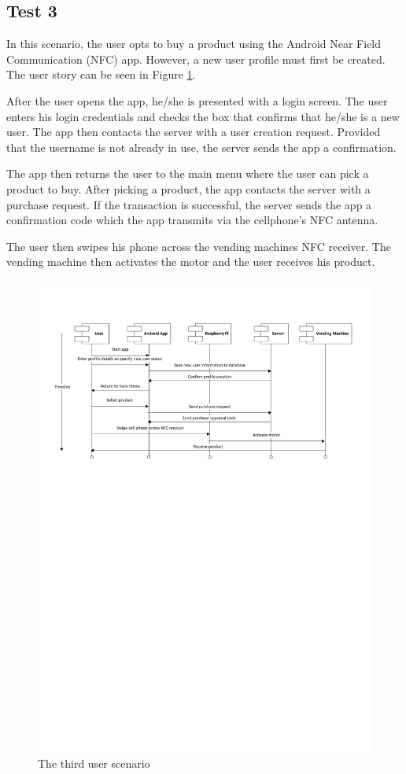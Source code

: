\subsection{Test 3}

In this scenario, the user opts to buy a product using the Android Near Field
Communication (NFC) app. However, a new user profile must first be created. The user story
can be seen in Figure \ref{fig:test3}.

After the user opens the app, he/she is presented with a login screen. The user enters
his login credentials and checks the box that confirms that he/she is a new user. The
app then contacts the server with a user creation request. Provided that the username is
not already in use, the server sends the app a confirmation.

The app then returns the user to the main menu where the user can pick a product to buy.
After picking a product, the app contacts the server with a purchase request. If the
transaction is successful, the server sends the app a confirmation code which the app 
transmits via the cellphone's NFC antenna. 

The user then swipes his phone across the vending machines NFC receiver. The vending
machine then activates the motor and the user receives his product. 

\begin{figure}
 \centering 
 \includegraphics[clip=true, trim = 0 500 0 50,
 scale=0.7]{user_story_3}
 \caption{The third user scenario}
 \label{fig:test3}
\end{figure}
